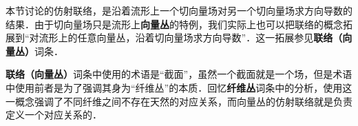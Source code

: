 本节讨论的仿射联络，是沿着流形上一个切向量场对另一个切向量场求方向导数的结果．由于切向量场只是流形上\textbf{向量丛}的特例，我们实际上也可以把联络的概念拓展到“对流形上的任意向量丛，沿着切向量场求方向导数”．这一拓展参见\textbf{联络（向量丛）}词条．

\textbf{联络（向量丛）}词条中使用的术语是“截面”，虽然一个截面就是一个场，但是术语中使用前者是为了强调其身为“纤维丛”的本质．回忆\textbf{纤维丛}词条中的分析，使用这一概念强调了不同纤维之间不存在天然的对应关系，而向量丛的仿射联络就是负责定义一个对应关系的．



